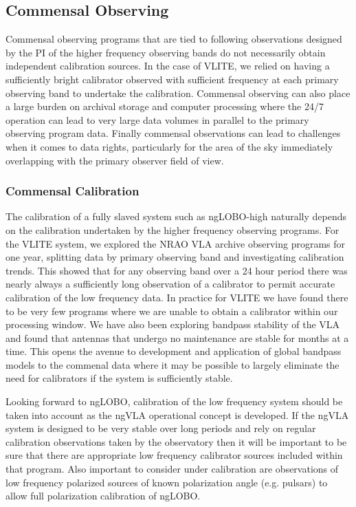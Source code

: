 \documentclass[11pt]{article}
\begin{document}
\subsection{Commensal Observing}

Commensal observing programs that are tied to following observations designed by the PI of the higher frequency observing bands do not necessarily obtain independent calibration sources. In the case of VLITE, we relied on having a sufficiently bright calibrator observed with sufficient frequency at each primary observing band to undertake the calibration. Commensal observing can also place a large burden on archival storage and computer processing where the 24/7 operation can lead to very large data volumes in parallel to the primary observing program data. Finally commensal observations can lead to challenges when it comes to data rights, particularly for the area of the sky immediately overlapping with the primary observer field of view.

\subsubsection{Commensal Calibration}

The calibration of a fully slaved system such as ngLOBO-high naturally depends on the calibration undertaken by the higher frequency observing programs. For the VLITE system, we explored the NRAO VLA archive observing programs for one year, splitting data by primary observing band and investigating calibration trends. This showed that for any observing band over a 24 hour period there was nearly always a sufficiently long observation of a calibrator to permit accurate calibration of the low frequency data. In practice for VLITE we have found there to be very few programs where we are unable to obtain a calibrator within our processing window. We have also been exploring bandpass stability of the VLA and found that antennas that undergo no maintenance are stable for months at a time. This opens the avenue to development and application of global bandpass models to the commenal data where it may be possible to largely eliminate the need for calibrators if the system is sufficiently stable.

Looking forward to ngLOBO, calibration of the low frequency system should be taken into account as the ngVLA operational concept is developed. If the ngVLA system is designed to be very stable over long periods and rely on regular calibration observations taken by the observatory then it will be important to be sure that there are appropriate low frequency calibrator sources included within that program. Also important to consider under calibration are observations of low frequency polarized sources of known polarization angle (e.g. pulsars) to allow full polarization calibration of ngLOBO.
\end{document}

